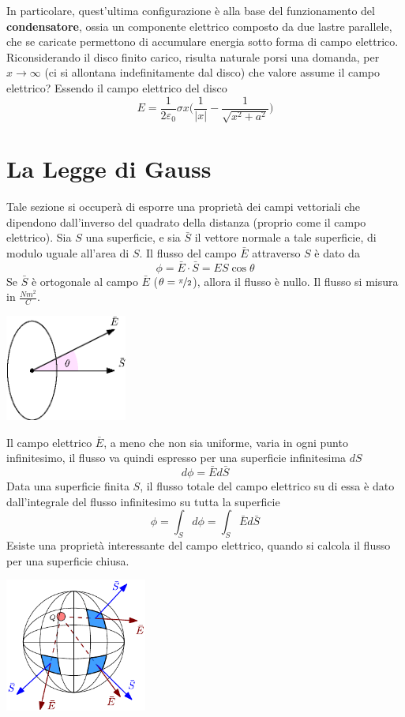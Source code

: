 \documentclass[10pt, letterpaper]{report}
\begin{document}
In particolare, quest'ultima configurazione è alla base del funzionamento del \textbf{condensatore}, ossia un componente elettrico composto da due lastre parallele, che se caricate permettono di accumulare energia sotto forma di campo elettrico.\acc 
Riconsiderando il disco finito carico, risulta naturale porsi una domanda, per $x\rightarrow \infty$ (ci si allontana indefinitamente dal disco) che valore assume il campo elettrico? Essendo il campo elettrico del disco 
$$ E=\frac{1}{2\varepsilon_0}\sigma x\Big( \frac{1}{|x|}-\frac{1}{\sqrt{x^2+a^2}} \Big)$$
\flowerLine 
\section{La Legge di Gauss}
Tale sezione si occuperà di esporre una proprietà dei campi vettoriali che dipendono dall'inverso del quadrato della distanza (proprio come il campo elettrico).\acc 
{} Sia $S$ una superficie, e sia $\bar S$ il vettore normale a tale superficie, di modulo uguale all'area di $S$. Il flusso del campo $\bar E$ attraverso $S$ è dato da 
$$ \phi=\bar E\cdot \bar S=ES\cos\theta$$
Se  $\bar S$ è ortogonale al campo $\bar E$ ($\theta = \nicefrac{\pi}{2}$), allora il flusso è nullo. Il flusso si misura in $\frac{Nm^2}{C}$.  \begin{center}
    \includegraphics[width=0.3\textwidth]{images/flusso.eps}
\end{center}
Il campo elettrico $\bar E$, a meno che non sia uniforme, varia in ogni punto infinitesimo, il flusso va quindi espresso per una superficie infinitesima $dS$
$$ d\phi=\bar Ed\bar S$$
Data una superficie finita $S$, il flusso totale del campo elettrico su di essa è dato dall'integrale del flusso infinitesimo su tutta la superficie 
$$ \phi = \int_S d\phi = \int_S \bar Ed\bar S$$
Esiste una proprietà interessante del campo elettrico, quando si calcola il flusso per una superficie chiusa. \begin{center}
    \includegraphics[width=0.35\textwidth]{images/flussoCampo2.pdf}
\end{center}
\end{document}

